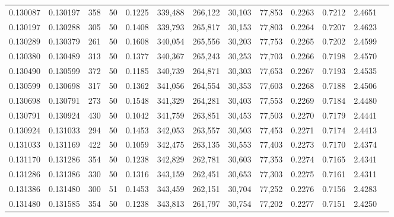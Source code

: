\begin{tabular}{rrrrrrrrrrrrr}
0.130087 & 0.130197 &   358 &  50 &                                     0.1225 & 339,488 & 266,122 &  30,103 &  77,853 & 0.2263 & 0.7212 & 2.4651 \\
0.130197 & 0.130288 &   305 &  50 &                                     0.1408 & 339,793 & 265,817 &  30,153 &  77,803 & 0.2264 & 0.7207 & 2.4623 \\
0.130289 & 0.130379 &   261 &  50 &                                     0.1608 & 340,054 & 265,556 &  30,203 &  77,753 & 0.2265 & 0.7202 & 2.4599 \\
0.130380 & 0.130489 &   313 &  50 &                                     0.1377 & 340,367 & 265,243 &  30,253 &  77,703 & 0.2266 & 0.7198 & 2.4570 \\
0.130490 & 0.130599 &   372 &  50 &                                     0.1185 & 340,739 & 264,871 &  30,303 &  77,653 & 0.2267 & 0.7193 & 2.4535 \\
0.130599 & 0.130698 &   317 &  50 &                                     0.1362 & 341,056 & 264,554 &  30,353 &  77,603 & 0.2268 & 0.7188 & 2.4506 \\
0.130698 & 0.130791 &   273 &  50 &                                     0.1548 & 341,329 & 264,281 &  30,403 &  77,553 & 0.2269 & 0.7184 & 2.4480 \\
0.130791 & 0.130924 &   430 &  50 &                                     0.1042 & 341,759 & 263,851 &  30,453 &  77,503 & 0.2270 & 0.7179 & 2.4441 \\
0.130924 & 0.131033 &   294 &  50 &                                     0.1453 & 342,053 & 263,557 &  30,503 &  77,453 & 0.2271 & 0.7174 & 2.4413 \\
0.131033 & 0.131169 &   422 &  50 &                                     0.1059 & 342,475 & 263,135 &  30,553 &  77,403 & 0.2273 & 0.7170 & 2.4374 \\
0.131170 & 0.131286 &   354 &  50 &                                     0.1238 & 342,829 & 262,781 &  30,603 &  77,353 & 0.2274 & 0.7165 & 2.4341 \\
0.131286 & 0.131386 &   330 &  50 &                                     0.1316 & 343,159 & 262,451 &  30,653 &  77,303 & 0.2275 & 0.7161 & 2.4311 \\
0.131386 & 0.131480 &   300 &  51 &                                     0.1453 & 343,459 & 262,151 &  30,704 &  77,252 & 0.2276 & 0.7156 & 2.4283 \\
0.131480 & 0.131585 &   354 &  50 &                                     0.1238 & 343,813 & 261,797 &  30,754 &  77,202 & 0.2277 & 0.7151 & 2.4250 \\

\end{tabular}
